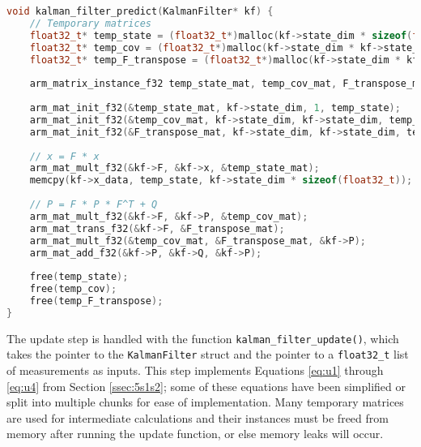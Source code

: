 \documentclass[11pt]{ucthesisCP}
\begin{document}
\begin{lstlisting}[language=C++]
void kalman_filter_predict(KalmanFilter* kf) {
	// Temporary matrices
	float32_t* temp_state = (float32_t*)malloc(kf->state_dim * sizeof(float32_t));
	float32_t* temp_cov = (float32_t*)malloc(kf->state_dim * kf->state_dim * sizeof(float32_t));
	float32_t* temp_F_transpose = (float32_t*)malloc(kf->state_dim * kf->state_dim * sizeof(float32_t));
	
	arm_matrix_instance_f32 temp_state_mat, temp_cov_mat, F_transpose_mat;
	
	arm_mat_init_f32(&temp_state_mat, kf->state_dim, 1, temp_state);
	arm_mat_init_f32(&temp_cov_mat, kf->state_dim, kf->state_dim, temp_cov);
	arm_mat_init_f32(&F_transpose_mat, kf->state_dim, kf->state_dim, temp_F_transpose);
	
	// x = F * x
	arm_mat_mult_f32(&kf->F, &kf->x, &temp_state_mat);
	memcpy(kf->x_data, temp_state, kf->state_dim * sizeof(float32_t));
	
	// P = F * P * F^T + Q
	arm_mat_mult_f32(&kf->F, &kf->P, &temp_cov_mat);
	arm_mat_trans_f32(&kf->F, &F_transpose_mat);
	arm_mat_mult_f32(&temp_cov_mat, &F_transpose_mat, &kf->P);
	arm_mat_add_f32(&kf->P, &kf->Q, &kf->P);
	
	free(temp_state);
	free(temp_cov);
	free(temp_F_transpose);
}
\end{lstlisting}

The update step is handled with the function \verb|kalman_filter_update()|, which takes the pointer to the \verb|KalmanFilter| struct and the pointer to a \verb|float32_t| list of measurements as inputs. This step implements Equations \ref{eq:u1} through \ref{eq:u4} from Section \ref{ssec:5s1s2}; some of these equations have been simplified or split into multiple chunks for ease of implementation. Many temporary matrices are used for intermediate calculations and their instances must be freed from memory after running the update function, or else memory leaks will occur.
\end{document}
